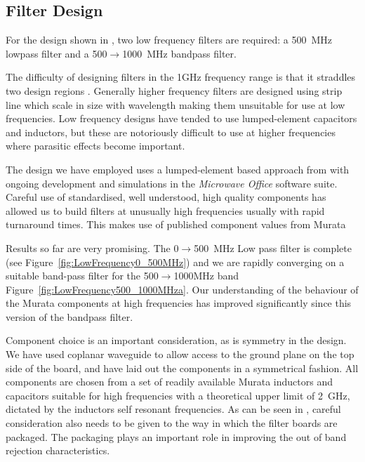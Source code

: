 \clearpage
\subsection{Filter Design}
\label{sec:lowfreqFilters}

For the design shown in , two low frequency filters are required: a 500~MHz lowpass filter and a 500$\rightarrow$1000~MHz bandpass filter.

The difficulty of designing filters in the 1GHz frequency range is that it straddles two design regions \cite{matthaei1980} . Generally higher frequency filters are designed using strip line which scale in size with wavelength making them unsuitable for use at low frequencies. Low frequency designs have tended to use lumped-element capacitors and inductors, but these are notoriously difficult to use at higher frequencies where parasitic effects become important.

The design we have employed uses a lumped-element based approach from  with ongoing development and simulations in the \textit{Microwave Office} software suite. Careful use of standardised, well understood, high quality components has allowed us to build filters at unusually high frequencies usually with rapid turnaround times. This makes use of published component values from Murata \cite{murataAWR}

Results so far are very promising. The 0$\rightarrow$500~MHz Low pass filter is complete (see Figure~\ref{fig:LowFrequency0_500MHz}) and we are rapidly converging on a suitable band-pass filter for the 500$\rightarrow$1000MHz band Figure~\ref{fig:LowFrequency500_1000MHza}. Our understanding of the behaviour of the Murata components at high frequencies has improved significantly since this version of the bandpass filter.

Component choice is an important consideration, as is symmetry in the design. We have used coplanar waveguide to allow access to the ground plane on the top side of the board, and have laid out the components in a symmetrical fashion. All components are chosen from a set of readily available Murata inductors and capacitors suitable for high frequencies with a theoretical upper limit of 2~GHz, dictated by the inductors self resonant frequencies. As can be seen in , careful consideration also needs to be given to the way in which the filter boards are packaged. The packaging plays an important role in improving the out of band rejection characteristics.

